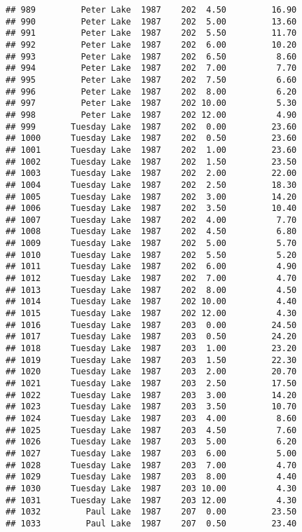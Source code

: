 \documentclass[
]{article}
\begin{document}
\begin{verbatim}
## 989         Peter Lake  1987    202  4.50         16.90
## 990         Peter Lake  1987    202  5.00         13.60
## 991         Peter Lake  1987    202  5.50         11.70
## 992         Peter Lake  1987    202  6.00         10.20
## 993         Peter Lake  1987    202  6.50          8.60
## 994         Peter Lake  1987    202  7.00          7.70
## 995         Peter Lake  1987    202  7.50          6.60
## 996         Peter Lake  1987    202  8.00          6.20
## 997         Peter Lake  1987    202 10.00          5.30
## 998         Peter Lake  1987    202 12.00          4.90
## 999       Tuesday Lake  1987    202  0.00         23.60
## 1000      Tuesday Lake  1987    202  0.50         23.60
## 1001      Tuesday Lake  1987    202  1.00         23.60
## 1002      Tuesday Lake  1987    202  1.50         23.50
## 1003      Tuesday Lake  1987    202  2.00         22.00
## 1004      Tuesday Lake  1987    202  2.50         18.30
## 1005      Tuesday Lake  1987    202  3.00         14.20
## 1006      Tuesday Lake  1987    202  3.50         10.40
## 1007      Tuesday Lake  1987    202  4.00          7.70
## 1008      Tuesday Lake  1987    202  4.50          6.80
## 1009      Tuesday Lake  1987    202  5.00          5.70
## 1010      Tuesday Lake  1987    202  5.50          5.20
## 1011      Tuesday Lake  1987    202  6.00          4.90
## 1012      Tuesday Lake  1987    202  7.00          4.70
## 1013      Tuesday Lake  1987    202  8.00          4.50
## 1014      Tuesday Lake  1987    202 10.00          4.40
## 1015      Tuesday Lake  1987    202 12.00          4.30
## 1016      Tuesday Lake  1987    203  0.00         24.50
## 1017      Tuesday Lake  1987    203  0.50         24.20
## 1018      Tuesday Lake  1987    203  1.00         23.20
## 1019      Tuesday Lake  1987    203  1.50         22.30
## 1020      Tuesday Lake  1987    203  2.00         20.70
## 1021      Tuesday Lake  1987    203  2.50         17.50
## 1022      Tuesday Lake  1987    203  3.00         14.20
## 1023      Tuesday Lake  1987    203  3.50         10.70
## 1024      Tuesday Lake  1987    203  4.00          8.60
## 1025      Tuesday Lake  1987    203  4.50          7.60
## 1026      Tuesday Lake  1987    203  5.00          6.20
## 1027      Tuesday Lake  1987    203  6.00          5.00
## 1028      Tuesday Lake  1987    203  7.00          4.70
## 1029      Tuesday Lake  1987    203  8.00          4.40
## 1030      Tuesday Lake  1987    203 10.00          4.30
## 1031      Tuesday Lake  1987    203 12.00          4.30
## 1032         Paul Lake  1987    207  0.00         23.50
## 1033         Paul Lake  1987    207  0.50         23.40

\end{verbatim}
\end{document}
